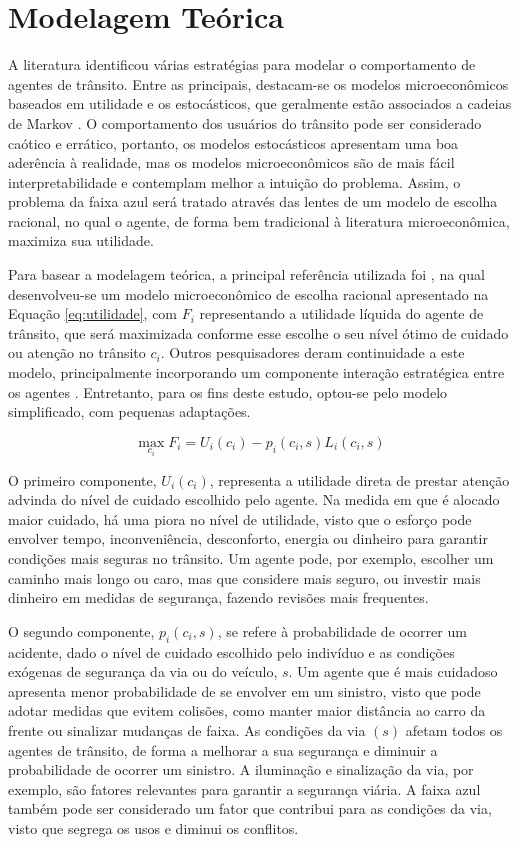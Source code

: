 \section{Modelagem Teórica}
\label{sec:modteor}

A literatura identificou várias estratégias para modelar o comportamento de agentes de trânsito. Entre as principais, destacam-se os modelos microeconômicos baseados em utilidade e os estocásticos, que geralmente estão associados a cadeias de Markov \cite{chen2021modeling}. O comportamento dos usuários do trânsito pode ser considerado caótico e errático, portanto, os modelos estocásticos apresentam uma boa aderência à realidade, mas os modelos microeconômicos são de mais fácil interpretabilidade e contemplam melhor a intuição do problema. Assim, o problema da faixa azul será tratado através das lentes de um modelo de escolha racional, no qual o agente, de forma bem tradicional à literatura microeconômica, maximiza sua utilidade.

Para basear a modelagem teórica, a principal referência utilizada foi \textcite{blomquist1986utility}, na qual desenvolveu-se um modelo microeconômico de escolha racional apresentado na Equação \ref{eq:utilidade}, com $F_i$ representando a utilidade líquida do agente de trânsito, que será maximizada conforme esse escolhe o seu nível ótimo de cuidado ou atenção no trânsito $c_i$. Outros pesquisadores deram continuidade a este modelo, principalmente incorporando um componente interação estratégica entre os agentes \cite{pedersen2003moral}. Entretanto, para os fins deste estudo, optou-se pelo modelo simplificado, com pequenas adaptações.

\begin{equation}
    \max_{c_i} F_i = U_i(c_i)-p_i(c_i,s)L_i(c_i,s)
    \label{eq:utilidade}
\end{equation}

O primeiro componente, $U_i(c_i)$, representa a utilidade direta de prestar atenção advinda do nível de cuidado escolhido pelo agente. Na medida em que é alocado maior cuidado, há uma piora no nível de utilidade, visto que o esforço pode envolver tempo, inconveniência, desconforto, energia ou dinheiro para garantir condições mais seguras no trânsito. Um agente pode, por exemplo, escolher um caminho mais longo ou caro, mas que considere mais seguro, ou investir mais dinheiro em medidas de segurança, fazendo revisões mais frequentes.

O segundo componente, $p_i(c_i,s)$, se refere à probabilidade de ocorrer um acidente, dado o nível de cuidado escolhido pelo indivíduo e as condições exógenas de segurança da via ou do veículo, $s$. Um agente que é mais cuidadoso apresenta menor probabilidade de se envolver em um sinistro, visto que pode adotar medidas que evitem colisões, como manter maior distância ao carro da frente ou sinalizar mudanças de faixa. As condições da via $(s)$ afetam todos os agentes de trânsito, de forma a melhorar a sua segurança e diminuir a probabilidade de ocorrer um sinistro. A iluminação e sinalização da via, por exemplo, são fatores relevantes para garantir a segurança viária. A faixa azul também pode ser considerado um fator que contribui para as condições da via, visto que segrega os usos e diminui os conflitos.

